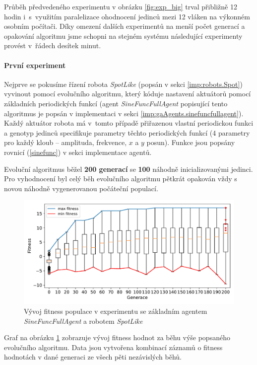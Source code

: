 Průběh předvedeného experimentu v obrázku \ref{fig:exp_big} trval přibližně 12
hodin i~s~využitím paralelizace ohodnocení jedinců mezi 12 vláken na výkonném
osobním počítači. Díky omezení dalších experimentů na menší počet generací a
opakování algoritmu jsme schopni na stejném systému následující experimenty
provést v~řádech desítek minut.

\paragraph{První experiment}
Nejprve se pokusíme řízení robota \emph{SpotLike} (popsán v sekci
\ref{imp:robots.Spot}) vyvinout pomocí evolučního algoritmu, který kóduje
nastavení aktuátorů pomocí základních periodických funkcí (agent
\emph{SineFuncFullAgent} popisující tento algoritmus je popsán v implementaci v
sekci \ref{imp:gaAgents.sinefuncfullagent}). Každý aktuátor robota má v~tomto
případě přiřazenou vlastní periodickou funkci a genotyp jedinců specifikuje
parametry těchto periodických funkcí (4 parametry pro každý kloub -- amplituda,
frekvence, $x$ a $y$ posun). Funkce jsou popsány rovnicí (\ref{sinefunc}) v
sekci implementace agentů.

Evoluční algoritmus běžel \textbf{200 generací} se \textbf{100} náhodně
inicializovanými jedinci. Pro vyhodnocení byl celý běh evolučního algoritmu
pětkrát opakován vždy s novou náhodně vygenerovanou počáteční populací.

\begin{figure}[!h]
    \centering
    \includegraphics[width=1\textwidth]{../img/experiment1_Sine_10ticks.pdf}
    \caption{Vývoj fitness populace v experimentu se základním agentem\\
    \emph{SineFuncFullAgent} a robotem \emph{SpotLike}}
    \label{exp:first_sinefull}
\end{figure}

Graf na obrázku \ref{exp:first_sinefull} zobrazuje vývoj fitness
hodnot za běhu výše popsaného evolučního algoritmu. Data jsou vytvořena
kombinací záznamů o fitness hodnotách v dané generaci ze všech pěti nezávislých
běhů.

